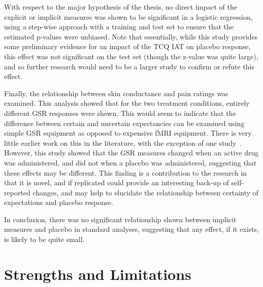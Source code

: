 With respect to the major hypothesis of the thesis, no direct impact
of the explicit or implicit measures was shown to be significant in a
logistic regression, using a step-wise approach with a training and
test set to ensure that the estimated p-values were unbiased. Note
that essentially, while this study provides some preliminary evidence
for an impact of the TCQ IAT on placebo response, this effect was not
significant on the test set (though the z-value was quite large), and
so further research would need to be a larger study to confirm or
refute this effect.


Finally, the relationship between skin conductance and pain ratings
was examined. This analysis showed that for the two treatment
conditions, entirely different GSR responses were shown. This would
seem to indicate that the difference between certain and uncertain
expectancies can be examined using simple GSR equipment as opposed to
expensive fMRI equipment. There is very little earlier work on this in
the literature, with the exception of one study~\cite{Fujita2000}.
However, this study showed that the GSR measures changed when an
active drug was administered, and did not when a placebo was
administered, suggesting that these effects may be different. This
finding is a contribution to the research in that it is novel, and if
replicated could provide an interesting back-up of self-reported
changes, and may help to elucidate the relationship between certainty
of expectations and placebo response.

In conclusion, there was no significant relationship shown between
implicit measures and placebo in standard analyses, suggesting that
any effect, if it exists, is likely to be quite small.

\section{Strengths and Limitations}
\label{sec:strengths-limit}

